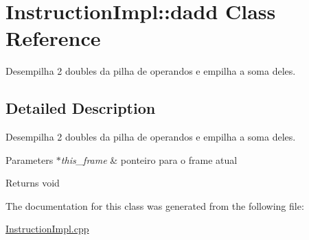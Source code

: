 \hypertarget{class_instruction_impl_1_1dadd}{}\section{Instruction\+Impl\+:\+:dadd Class Reference}
\label{class_instruction_impl_1_1dadd}


Desempilha 2 doubles da pilha de operandos e empilha a soma deles.  




\subsection{Detailed Description}
Desempilha 2 doubles da pilha de operandos e empilha a soma deles. 


\begin{DoxyParams}{Parameters}
{\em $\ast$this\+\_\+frame} & ponteiro para o frame atual \\
\hline
\end{DoxyParams}
\begin{DoxyReturn}{Returns}
void 
\end{DoxyReturn}


The documentation for this class was generated from the following file\+:\begin{DoxyCompactItemize}
\item 
\hyperlink{_instruction_impl_8cpp}{Instruction\+Impl.\+cpp}\end{DoxyCompactItemize}
